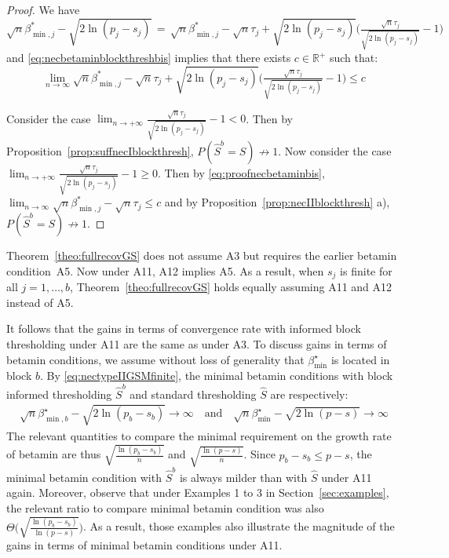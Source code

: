 \documentclass[aos]{imsart}
\theoremstyle{plain}
\newcommand{\R}{\mathbb{R}}
\begin{document}
\begin{proof}

  We have $\sqrt{n}\beta_{\min,j}^*-\sqrt{2\ln(p_j-s_j)} \,=\, \sqrt{n}\beta_{\min,j}^*-\sqrt{n}\tau_j+\sqrt{2\ln(p_j-s_j)}\Big(\tfrac{\sqrt{n}\tau_j}{\sqrt{2\ln(p_j-s_j)}}-1\Big)$ and \eqref{eq:necbetaminblockthreshbis} implies that there exists $c\in\R^+$ such that:
  \begin{equation}\label{eq:proofnecbetaminbis}
      \lim_{n\to \infty}\sqrt{n}\beta_{\min,j}^*-\sqrt{n}\tau_j+\sqrt{2\ln(p_j-s_j)}\Big(\tfrac{\sqrt{n}\tau_j}{\sqrt{2\ln(p_j-s_j)}}-1\Big)\leq c
  \end{equation}

Consider the case $\lim_{n\to +\infty}\tfrac{\sqrt{n}\tau_j}{\sqrt{2\ln(p_j-s_j)}}-1<0$. Then by Proposition~\ref{prop:suffnecIblockthresh},
$P(\hat{S}^{b} = S)\not \to 1$. 
Now consider the case $\lim_{n\to +\infty}\tfrac{\sqrt{n}\tau_j}{\sqrt{2\ln(p_j-s_j)}}-1 \geq0$. Then by \eqref{eq:proofnecbetaminbis},  $\lim_{n\to \infty}\sqrt{n}\beta_{\min,j}^*-\sqrt{n}\tau_j \leq c$ and by Proposition~\ref{prop:necIIblockthresh} a), $P(\hat{S}^{b} = S)\not \to 1$.
\end{proof}

Theorem~\ref{theo:fullrecovGS} does not assume A3 but requires the earlier betamin condition~A5. Now under A11, A12 implies A5. As a result, when $s_j$ is finite for all $j=1,\ldots,b$, Theorem~\ref{theo:fullrecovGS} holds equally assuming A11 and A12 instead of A5.

It follows that the gains in terms of convergence rate with  informed block thresholding under A11 are the same as under A3. To discuss gains in terms of betamin conditions, we assume without loss of generality that $\beta_{\min}^{\star}$ is located in block $b$. By \eqref{eq:nectypeIIGSMfinite}, the minimal betamin conditions with block informed thresholding $\hat{S}^{b}$ and standard thresholding $\hat{S}$ are respectively:
\begin{eqnarray}
    \sqrt{n}\beta_{\min,b}^{\star}-\sqrt{2\ln(p_b-s_b)} \to \infty \quad\text{and}\quad
    \sqrt{n}\beta_{\min}^{\star}-\sqrt{2\ln(p-s)} \to \infty
\end{eqnarray}
The relevant quantities to compare the minimal requirement on the growth rate of betamin are thus $\sqrt{\tfrac{\ln(p_b-s_b)}{n}}$ and $\sqrt{\tfrac{\ln(p-s)}{n}}$. Since $p_b-s_b \leq p - s$, the minimal betamin condition with $\hat{S}^{b}$ is always milder than with $\hat{S}$ under A11 again. Moreover, observe that under Examples 1 to 3 in Section~\ref{sec:examples}, the relevant ratio to compare minimal betamin condition was also $\Theta\Big(\sqrt{\tfrac{\ln(p_b-s_b)}{\ln(p-s)}}\Big)$. As a result, those examples also illustrate the magnitude of the gains in terms of minimal betamin conditions under A11.
\end{document}
